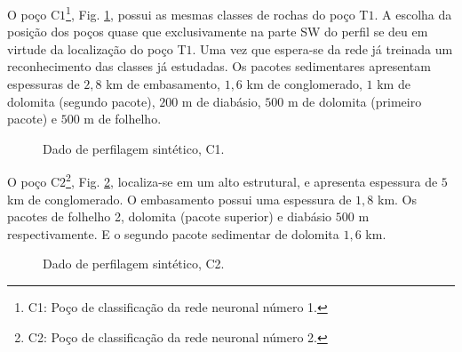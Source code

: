 O poço C$1$\footnote{C1: Poço de classificação da rede neuronal número 1.}, Fig. \ref{C1}, possui as mesmas classes de rochas do poço T$1$. A escolha da posição dos poços quase que exclusivamente na parte SW do perfil se deu em virtude da localização do poço T$1$. Uma vez que espera-se da rede já treinada um reconhecimento das classes já estudadas. Os pacotes sedimentares apresentam espessuras de $2,8$ km de embasamento, $1,6$ km de conglomerado, $1$ km de dolomita (segundo pacote), $200$ m de diabásio, $500$ m de dolomita (primeiro pacote) e $500$ m de folhelho. 

\begin{figure}[H]
	\centering
	\setlength{\fboxsep}{8pt}
	\setlength{\fboxrule}{0.1pt}
	\caption{Dado de perfilagem sintético, C1.}
	\label{C1}
\end{figure}

O poço C$2$\footnote{C2: Poço de classificação da rede neuronal número 2.}, Fig. \ref{C2}, localiza-se em um alto estrutural, e apresenta espessura de $5$ km de conglomerado. O embasamento possui uma espessura de $1,8$ km. Os pacotes de folhelho 2, dolomita (pacote superior) e diabásio $500$ m respectivamente. E o segundo pacote sedimentar de dolomita $1,6$ km.

\begin{figure}[H]
	\centering
	\setlength{\fboxsep}{8pt}
	\setlength{\fboxrule}{0.1pt}
	\caption{Dado de perfilagem sintético, C2.}
	\label{C2}
\end{figure}

